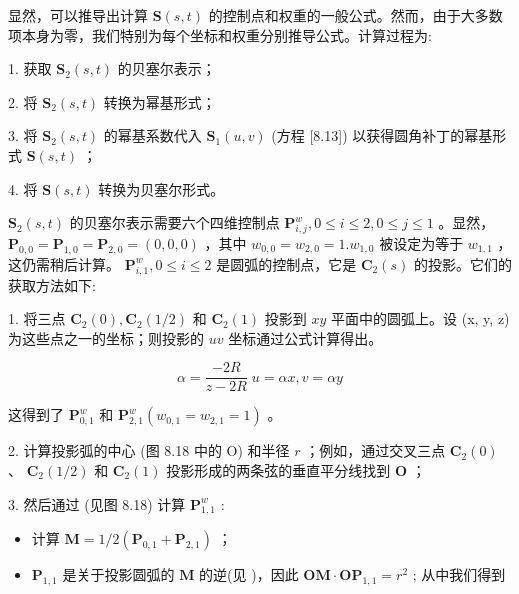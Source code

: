 \documentclass[../main.tex]{subfiles}
\begin{document}
显然，可以推导出计算 \(\mathbf{S}\left( {s,t}\right)\) 的控制点和权重的一般公式。然而，由于大多数项本身为零，我们特别为每个坐标和权重分别推导公式。计算过程为:





1. 获取 \({\mathbf{S}}_{2}\left( {s,t}\right)\) 的贝塞尔表示；

2. 将 \({\mathbf{S}}_{2}\left( {s,t}\right)\) 转换为幂基形式；

3. 将 \({\mathbf{S}}_{2}\left( {s,t}\right)\) 的幂基系数代入 \({\mathbf{S}}_{1}\left( {u,v}\right)\) (方程 [8.13]) 以获得圆角补丁的幂基形式 \(\mathbf{S}\left( {s,t}\right)\) ；

4. 将 \(\mathbf{S}\left( {s,t}\right)\) 转换为贝塞尔形式。

\({\mathbf{S}}_{2}\left( {s,t}\right)\) 的贝塞尔表示需要六个四维控制点 \({\mathbf{P}}_{i,j}^{w},0 \leq  i \leq  2,0 \leq  j \leq  1\) 。显然， \({\mathbf{P}}_{0,0} = {\mathbf{P}}_{1,0} = {\mathbf{P}}_{2,0} = \left( {0,0,0}\right)\) ，其中 \({w}_{0,0} = {w}_{2,0} = 1.{w}_{1,0}\) 被设定为等于 \({w}_{1,1}\) ，这仍需稍后计算。 \({\mathbf{P}}_{i,1}^{w},0 \leq  i \leq  2\) 是圆弧的控制点，它是 \({\mathbf{C}}_{2}\left( s\right)\) 的投影。它们的获取方法如下:

1. 将三点 \({\mathbf{C}}_{2}\left( 0\right) ,{\mathbf{C}}_{2}\left( {1/2}\right)\) 和 \({\mathbf{C}}_{2}\left( 1\right)\) 投影到 \({xy}\) 平面中的圆弧上。设 (x, y, z) 为这些点之一的坐标；则投影的 \({uv}\) 坐标通过公式计算得出。

\[
\alpha  = \frac{-{2R}}{z - {2R}}\;u = {\alpha x},v = {\alpha y} \tag{8.14}
\]

这得到了 \({\mathbf{P}}_{0,1}^{w}\) 和 \({\mathbf{P}}_{2,1}^{w}\left( {{w}_{0,1} = {w}_{2,1} = 1}\right)\) 。

2. 计算投影弧的中心 (图 8.18 中的 O) 和半径 \(r\) ；例如，通过交叉三点 \({\mathbf{C}}_{2}\left( 0\right)\) 、 \({\mathbf{C}}_{2}\left( {1/2}\right)\) 和 \({\mathbf{C}}_{2}\left( 1\right)\) 投影形成的两条弦的垂直平分线找到 \(\mathbf{O}\) ；

3. 然后通过 (见图 8.18) 计算 \({\mathbf{P}}_{1,1}^{w}\) :

\begin{itemize}
\item 计算 \(\mathbf{M} = 1/2\left( {{\mathbf{P}}_{0,1} + {\mathbf{P}}_{2,1}}\right)\) ；
\end{itemize}

\begin{itemize}
\item \({\mathbf{P}}_{1,1}\) 是关于投影圆弧的 \(\mathbf{M}\) 的逆(见 \cite{Coxe67})，因此 \(\mathbf{{OM}} \cdot  {\mathbf{{OP}}}_{1,1} = {r}^{2}\) ; 从中我们得到
\end{itemize}
\end{document}
